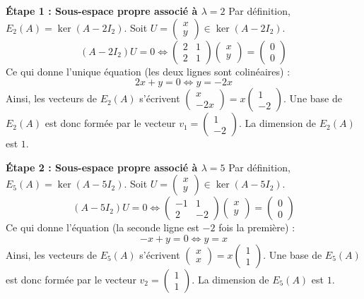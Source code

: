\documentclass[11pt,a4paper]{article}
\begin{document}
\textbf{Étape 1 : Sous-espace propre associé à $\lambda = 2$}
Par définition, $E_2(A) = \ker(A - 2I_2)$.
Soit $U = \begin{pmatrix} x \\ y \end{pmatrix} \in \ker(A - 2I_2)$.
$$(A - 2I_2)U = 0 \iff \begin{pmatrix} 2 & 1 \\ 2 & 1 \end{pmatrix} \begin{pmatrix} x \\ y \end{pmatrix} = \begin{pmatrix} 0 \\ 0 \end{pmatrix}$$
Ce qui donne l'unique équation (les deux lignes sont colinéaires) :
$$2x + y = 0 \iff y = -2x$$
Ainsi, les vecteurs de $E_2(A)$ s'écrivent $\begin{pmatrix} x \\ -2x \end{pmatrix} = x \begin{pmatrix} 1 \\ -2 \end{pmatrix}$.
Une base de $E_2(A)$ est donc formée par le vecteur $v_1 = \begin{pmatrix} 1 \\ -2 \end{pmatrix}$. La dimension de $E_2(A)$ est $1$.

\textbf{Étape 2 : Sous-espace propre associé à $\lambda = 5$}
Par définition, $E_5(A) = \ker(A - 5I_2)$.
Soit $U = \begin{pmatrix} x \\ y \end{pmatrix} \in \ker(A - 5I_2)$.
$$(A - 5I_2)U = 0 \iff \begin{pmatrix} -1 & 1 \\ 2 & -2 \end{pmatrix} \begin{pmatrix} x \\ y \end{pmatrix} = \begin{pmatrix} 0 \\ 0 \end{pmatrix}$$
Ce qui donne l'équation (la seconde ligne est $-2$ fois la première) :
$$-x + y = 0 \iff y = x$$
Ainsi, les vecteurs de $E_5(A)$ s'écrivent $\begin{pmatrix} x \\ x \end{pmatrix} = x \begin{pmatrix} 1 \\ 1 \end{pmatrix}$.
Une base de $E_5(A)$ est donc formée par le vecteur $v_2 = \begin{pmatrix} 1 \\ 1 \end{pmatrix}$. La dimension de $E_5(A)$ est $1$.
\end{document}
